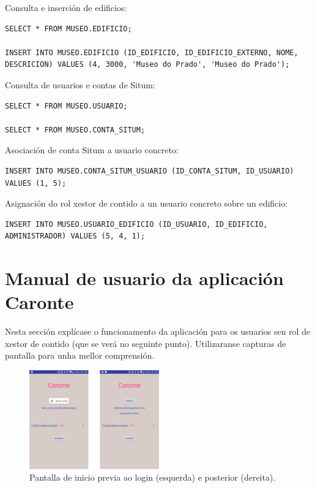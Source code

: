 Consulta e inserción de edificios:
\begin{lstlisting}
SELECT * FROM MUSEO.EDIFICIO;

INSERT INTO MUSEO.EDIFICIO (ID_EDIFICIO, ID_EDIFICIO_EXTERNO, NOME, DESCRICION) VALUES (4, 3000, 'Museo do Prado', 'Museo do Prado');
\end{lstlisting}

Consulta de usuarios e contas de Situm:
\begin{lstlisting}
SELECT * FROM MUSEO.USUARIO;

SELECT * FROM MUSEO.CONTA_SITUM;
\end{lstlisting}

Asociación de conta Situm a usuario concreto:
\begin{lstlisting}
INSERT INTO MUSEO.CONTA_SITUM_USUARIO (ID_CONTA_SITUM, ID_USUARIO) VALUES (1, 5);
\end{lstlisting}

Asignación do rol xestor de contido a un usuario concreto sobre un edificio:
\begin{lstlisting}
INSERT INTO MUSEO.USUARIO_EDIFICIO (ID_USUARIO, ID_EDIFICIO, ADMINISTRADOR) VALUES (5, 4, 1);
\end{lstlisting}


\section{Manual de usuario da aplicación Caronte}
Nesta sección explícase o funcionamento da aplicación para os usuarios sen rol de xestor de contido (que se verá no seguinte punto). Utilizaranse capturas de pantalla para unha mellor comprensión.

\begin{figure}[h]
	\begin{center}
		\includegraphics[width=0.5\textwidth]{figures/android/capturaInicio}
		\caption{Pantalla de inicio previa ao login (esquerda) e posterior (dereita).}
		\label{fig:capturaInicio}
	\end{center}
\end{figure}

